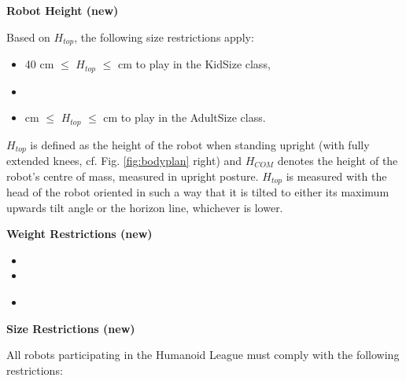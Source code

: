 \bigskip

{\bfseries Robot Height (new)}

\headlinebox

Based on $H_{top}$, the following size restrictions apply:

\begin{itemize}
\item 40 cm ${\leq}$ $H_{top}$ ${\leq}$   cm to play in the KidSize class,
\item {}
\item {}  cm ${\leq}$ $H_{top}$ ${\leq}$
        cm to play in the AdultSize class.
\end{itemize}

$H_{top}$ is defined as the height of the robot when standing upright (with fully extended knees, cf. Fig. \ref{fig:bodyplan} right) and $H_{COM}$ denotes the height of the robot's centre of mass, measured in upright posture. $H_{top}$ is measured with the head of the robot oriented in such a way that it is tilted to either its maximum upwards tilt angle or the horizon line, whichever is lower.

\bigskip

{\bfseries Weight Restrictions (new)}

\headlinebox

\begin{itemize}
\item {}
\item {}
\end{itemize}

\begin{itemize}
\item {}
\end{itemize}

\bigskip

{\bfseries Size Restrictions (new)}

\headlinebox

All robots participating in the Humanoid League must comply with the following restrictions:

